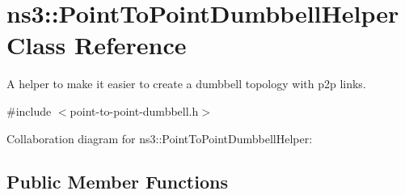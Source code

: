 \hypertarget{classns3_1_1PointToPointDumbbellHelper}{}\section{ns3\+:\+:Point\+To\+Point\+Dumbbell\+Helper Class Reference}
\label{classns3_1_1PointToPointDumbbellHelper}


A helper to make it easier to create a dumbbell topology with p2p links.  




{\ttfamily \#include $<$point-\/to-\/point-\/dumbbell.\+h$>$}



Collaboration diagram for ns3\+:\+:Point\+To\+Point\+Dumbbell\+Helper\+:
\subsection*{Public Member Functions}
